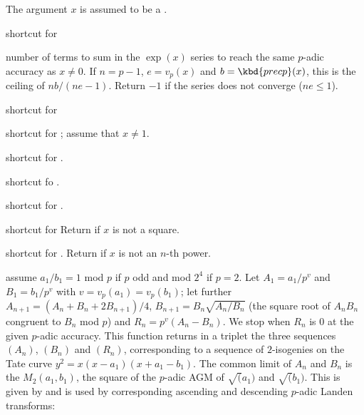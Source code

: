 
The argument $x$ is assumed to be a .

 shortcut for 

 number of terms to sum in the $\exp(x)$
series to reach the same $p$-adic accuracy as $x\neq 0$. If $n = p-1$, $e =
v_p(x)$ and $b = \kbd{precp}(x)$, this is the ceiling of $nb / (ne - 1)$.
Return $-1$ if the series does not converge ($ne \leq 1$).

 shortcut for 

 shortcut for ;
assume that $x\neq 1$.

 shortcut for
 .

 shortcut fo .


 shortcut for .

 shortcut for 
Return  if $x$ is not a square.

 shortcut for . Return  if $x$ is not an $n$-th power.

 assume $a_1/b_1 = 1$ mod $p$
if $p$ odd and mod $2^4$ if $p = 2$. Let $A_1 = a_1/p^v$ and $B_1 = b_1/p^v$
with $v = v_p(a_1) = v_p(b_1)$; let further
$A_{n+1} = (A_n + B_n + 2 B_{n+1}) / 4$,
$B_{n+1} = B_n \sqrt{A_n / B_n}$ (the square root of $A_n B_n$ congruent to
$B_n$ mod $p$) and $R_n = p^v(A_n - B_n)$. We stop when $R_n$ is $0$
at the given $p$-adic accuracy. This function returns in a triplet 
the three sequences $(A_n)$, $(B_n)$ and $(R_n)$, corresponding to a sequence
of $2$-isogenies on the Tate curve $y^2 = x(x-a_1)(x+a_1-b_1)$. The
common limit of $A_n$ and $B_n$ is the $M_2(a_1,b_1)$, the square
of the $p$-adic AGM of $\sqrt(a_1)$ and $\sqrt(b_1)$. This is given
by  and is used by corresponding ascending and descending
$p$-adic Landen transforms:



